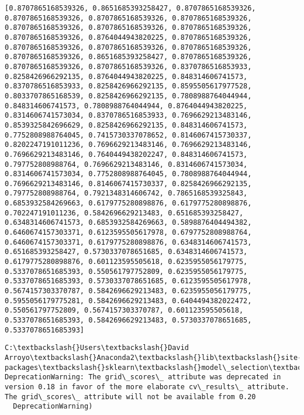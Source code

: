 \documentclass[11pt]{article}
\begin{document}
    \begin{Verbatim}[commandchars=\\\{\}]
[0.8707865168539326, 0.8651685393258427, 0.8707865168539326, 0.8707865168539326, 0.8707865168539326, 0.8707865168539326, 0.8707865168539326, 0.8707865168539326, 0.8707865168539326, 0.8707865168539326, 0.8764044943820225, 0.8707865168539326, 0.8707865168539326, 0.8707865168539326, 0.8707865168539326, 0.8707865168539326, 0.8651685393258427, 0.8707865168539326, 0.8707865168539326, 0.8707865168539326, 0.8370786516853933, 0.8258426966292135, 0.8764044943820225, 0.848314606741573, 0.8370786516853933, 0.8258426966292135, 0.8595505617977528, 0.8033707865168539, 0.8258426966292135, 0.7808988764044944, 0.848314606741573, 0.7808988764044944, 0.8764044943820225, 0.8314606741573034, 0.8370786516853933, 0.7696629213483146, 0.8539325842696629, 0.8258426966292135, 0.848314606741573, 0.7752808988764045, 0.7415730337078652, 0.8146067415730337, 0.8202247191011236, 0.7696629213483146, 0.7696629213483146, 0.7696629213483146, 0.7640449438202247, 0.848314606741573, 0.797752808988764, 0.7696629213483146, 0.8314606741573034, 0.8314606741573034, 0.7752808988764045, 0.7808988764044944, 0.7696629213483146, 0.8146067415730337, 0.8258426966292135, 0.797752808988764, 0.7921348314606742, 0.7865168539325843, 0.6853932584269663, 0.6179775280898876, 0.6179775280898876, 0.702247191011236, 0.5842696629213483, 0.651685393258427, 0.6348314606741573, 0.6853932584269663, 0.5898876404494382, 0.6460674157303371, 0.6123595505617978, 0.6797752808988764, 0.6460674157303371, 0.6179775280898876, 0.6348314606741573, 0.651685393258427, 0.5730337078651685, 0.6348314606741573, 0.6179775280898876, 0.601123595505618, 0.6235955056179775, 0.5337078651685393, 0.550561797752809, 0.6235955056179775, 0.5337078651685393, 0.5730337078651685, 0.6123595505617978, 0.5674157303370787, 0.5842696629213483, 0.6235955056179775, 0.5955056179775281, 0.5842696629213483, 0.6404494382022472, 0.550561797752809, 0.5674157303370787, 0.601123595505618, 0.5337078651685393, 0.5842696629213483, 0.5730337078651685, 0.5337078651685393]

    \end{Verbatim}

    \begin{Verbatim}[commandchars=\\\{\}]
C:\textbackslash{}Users\textbackslash{}David Arroyo\textbackslash{}Anaconda2\textbackslash{}lib\textbackslash{}site-packages\textbackslash{}sklearn\textbackslash{}model\_selection\textbackslash{}\_search.py:761: DeprecationWarning: The grid\_scores\_ attribute was deprecated in version 0.18 in favor of the more elaborate cv\_results\_ attribute. The grid\_scores\_ attribute will not be available from 0.20
  DeprecationWarning)

    \end{Verbatim}
\end{document}
